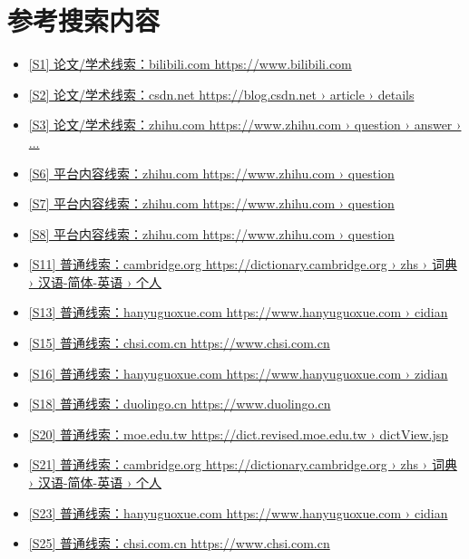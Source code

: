 \documentclass[UTF8,zihao=-4]{ctexart}
\begin{document}
\section*{参考搜索内容}
\begin{itemize}[leftmargin=2em]
\item \href{https://www.bilibili.com/}{[S1] 论文/学术线索：bilibili.com https://www.bilibili.com}
\item \href{https://blog.csdn.net/m0_57545130/article/details/156652649}{[S2] 论文/学术线索：csdn.net https://blog.csdn.net › article › details}
\item \href{https://www.zhihu.com/question/384545836/answer/1258678582?utm_oi=1349430621505208321}{[S3] 论文/学术线索：zhihu.com https://www.zhihu.com › question › answer › ...}
\item \href{https://www.zhihu.com/question/456232727}{[S6] 平台内容线索：zhihu.com https://www.zhihu.com › question}
\item \href{https://www.zhihu.com/question/1905315417062352732}{[S7] 平台内容线索：zhihu.com https://www.zhihu.com › question}
\item \href{https://www.zhihu.com/question/9497389872}{[S8] 平台内容线索：zhihu.com https://www.zhihu.com › question}
\item \href{https://dictionary.cambridge.org/zhs/%E8%AF%8D%E5%85%B8/%E6%B1%89%E8%AF%AD-%E7%AE%80%E4%BD%93-%E8%8B%B1%E8%AF%AD/%E4%B8%AA%E4%BA%BA}{[S11] 普通线索：cambridge.org https://dictionary.cambridge.org › zhs › 词典 › 汉语-简体-英语 › 个人}
\item \href{https://www.hanyuguoxue.com/cidian/ci-bd2f7f480}{[S13] 普通线索：hanyuguoxue.com https://www.hanyuguoxue.com › cidian}
\item \href{https://www.chsi.com.cn/}{[S15] 普通线索：chsi.com.cn https://www.chsi.com.cn}
\item \href{https://www.hanyuguoxue.com/zidian/zi-22810}{[S16] 普通线索：hanyuguoxue.com https://www.hanyuguoxue.com › zidian}
\item \href{https://www.duolingo.cn/}{[S18] 普通线索：duolingo.cn https://www.duolingo.cn}
\item \href{https://dict.revised.moe.edu.tw/dictView.jsp?ID=2319&la=0&powerMode=0}{[S20] 普通线索：moe.edu.tw https://dict.revised.moe.edu.tw › dictView.jsp}
\item \href{https://dictionary.cambridge.org/zhs/%E8%AF%8D%E5%85%B8/%E6%B1%89%E8%AF%AD-%E7%AE%80%E4%BD%93-%E8%8B%B1%E8%AF%AD/%E4%B8%AA%E4%BA%BA}{[S21] 普通线索：cambridge.org https://dictionary.cambridge.org › zhs › 词典 › 汉语-简体-英语 › 个人}
\item \href{https://www.hanyuguoxue.com/cidian/ci-bd2f7f480}{[S23] 普通线索：hanyuguoxue.com https://www.hanyuguoxue.com › cidian}
\item \href{https://www.chsi.com.cn/}{[S25] 普通线索：chsi.com.cn https://www.chsi.com.cn}
\end{itemize}
\end{document}
